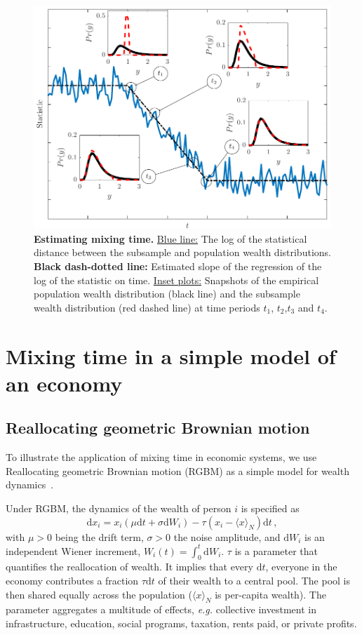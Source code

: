 \documentclass[11pt]{article}
\newcommand{\eg}{{\it e.g.}\xspace}
\newcommand{\be}{\begin{equation}}
\newcommand{\ee}{\end{equation}}
\numberwithin{equation}{section}
\begin{document}
\begin{figure}[!htb]
\centering
\includegraphics[width=1.0\textwidth]{figs/fig_mixing_time.pdf}
\caption{\textbf{Estimating mixing time.} \underline{Blue line:} The log of the statistical distance between the subsample and population wealth distributions. \textbf{Black dash-dotted line:} Estimated slope of the regression of the log of the statistic on time. \underline{Inset plots:} Snapshots of the empirical population wealth distribution (black line) and the subsample wealth distribution (red dashed line) at time periods $t_1$, $t_2$,$t_3$ and $t_4$. \label{fig:mixing-time}}
\end{figure}

\FloatBarrier

\section{Mixing time in a simple model of an economy}\label{sec:rgbm}

\subsection{Reallocating geometric Brownian motion}

To illustrate the application of mixing time in economic systems, we use Reallocating geometric Brownian motion (RGBM) as a simple model for wealth dynamics~\citep{BermanPetersAdamou2019}.

Under RGBM, the dynamics of the wealth of person $i$ is specified as
%
\be
    \mathrm{d} x_i = x_i \left( \mu \mathrm{d}t + \sigma \mathrm{d}W_i \right) - \tau \left( x_i - \langle x \rangle_N \right) \mathrm{d}t\,,
\label{eq:rgbm}
\ee
%
with $\mu > 0$ being the drift term, $\sigma > 0$ the noise amplitude, and $\mathrm{d}W_i$ is an independent Wiener increment, $W_i(t) =\int_0^t \mathrm{d}W_i$. $\tau$ is a parameter that quantifies the reallocation of wealth. It implies that every $\mathrm{d}t$, everyone in the economy contributes a fraction $\tau\mathrm{d}t$ of their wealth to a central pool. The pool is then shared equally across the population ($\langle x \rangle_N$ is per-capita wealth). The parameter aggregates a multitude of effects, \eg collective investment in infrastructure, education, social programs, taxation, rents paid, or private profits.
\end{document}
